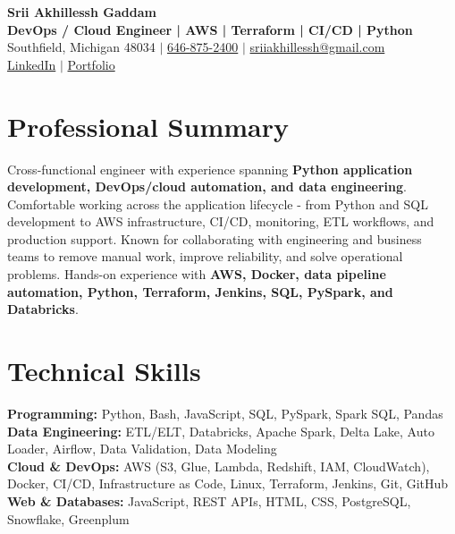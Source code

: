 \documentclass[letterpaper,10pt]{article}
\begin{document}
\fontsize{9.35pt}{10.45pt}\selectfont

\begin{center}
    {\LARGE \textbf{Srii Akhillessh Gaddam}} \\[-1pt]
    \textbf{DevOps / Cloud Engineer | AWS | Terraform | CI/CD | Python} \\[2pt]
    Southfield, Michigan 48034 $|$
    \href{tel:6468752400}{646-875-2400} $|$
    \href{mailto:sriiakhillessh@gmail.com}{sriiakhillessh@gmail.com} \\[1pt]
    \href{https://www.linkedin.com/in/srii-akhiilessh-gaddam-b48668191/}{LinkedIn} $|$
    \href{https://sriiakhillesshg.github.io/portfolio/}{Portfolio}
\end{center}
\vspace{-8pt}

\section{Professional Summary}
\small{Cross-functional engineer with experience spanning \textbf{Python application development, DevOps/cloud automation, and data engineering}. Comfortable working across the application lifecycle - from Python and SQL development to AWS infrastructure, CI/CD, monitoring, ETL workflows, and production support. Known for collaborating with engineering and business teams to remove manual work, improve reliability, and solve operational problems. Hands-on experience with \textbf{AWS, Docker, data pipeline automation, Python, Terraform, Jenkins, SQL, PySpark, and Databricks}.}

\section{Technical Skills}
\small{
\textbf{Programming:} Python, Bash, JavaScript, SQL, PySpark, Spark SQL, Pandas \\
\textbf{Data Engineering:} ETL/ELT, Databricks, Apache Spark, Delta Lake, Auto Loader, Airflow, Data Validation, Data Modeling \\
\textbf{Cloud \& DevOps:} AWS (S3, Glue, Lambda, Redshift, IAM, CloudWatch), Docker, CI/CD, Infrastructure as Code, Linux, Terraform, Jenkins, Git, GitHub \\
\textbf{Web \& Databases:} JavaScript, REST APIs, HTML, CSS, PostgreSQL, Snowflake, Greenplum
}
\end{document}
